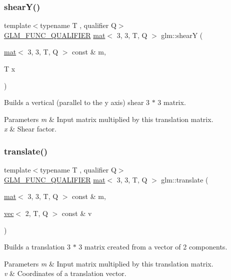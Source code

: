 \subsubsection{\texorpdfstring{shear\+Y()}{shearY()}}
{\footnotesize\ttfamily template$<$typename T , qualifier Q$>$ \\
\mbox{\hyperlink{setup_8hpp_a33fdea6f91c5f834105f7415e2a64407}{G\+L\+M\+\_\+\+F\+U\+N\+C\+\_\+\+Q\+U\+A\+L\+I\+F\+I\+ER}} \mbox{\hyperlink{structglm_1_1mat}{mat}}$<$ 3, 3, T, Q $>$ glm\+::shearY (\begin{DoxyParamCaption}\item[{\mbox{\hyperlink{structglm_1_1mat}{mat}}$<$ 3, 3, T, Q $>$ const \&}]{m,  }\item[{T}]{x }\end{DoxyParamCaption})}

Builds a vertical (parallel to the y axis) shear 3 $\ast$ 3 matrix.


\begin{DoxyParams}{Parameters}
{\em m} & Input matrix multiplied by this translation matrix. \\
\hline
{\em x} & Shear factor. \\
\hline
\end{DoxyParams}
\mbox{\label{group__gtx__matrix__transform__2d_gaa862e868893cf0b963e1d52e5dfb20c0}} 
\subsubsection{\texorpdfstring{translate()}{translate()}}
{\footnotesize\ttfamily template$<$typename T , qualifier Q$>$ \\
\mbox{\hyperlink{setup_8hpp_a33fdea6f91c5f834105f7415e2a64407}{G\+L\+M\+\_\+\+F\+U\+N\+C\+\_\+\+Q\+U\+A\+L\+I\+F\+I\+ER}} \mbox{\hyperlink{structglm_1_1mat}{mat}}$<$ 3, 3, T, Q $>$ glm\+::translate (\begin{DoxyParamCaption}\item[{\mbox{\hyperlink{structglm_1_1mat}{mat}}$<$ 3, 3, T, Q $>$ const \&}]{m,  }\item[{\mbox{\hyperlink{structglm_1_1vec}{vec}}$<$ 2, T, Q $>$ const \&}]{v }\end{DoxyParamCaption})}

Builds a translation 3 $\ast$ 3 matrix created from a vector of 2 components.


\begin{DoxyParams}{Parameters}
{\em m} & Input matrix multiplied by this translation matrix. \\
\hline
{\em v} & Coordinates of a translation vector. \\
\hline
\end{DoxyParams}
